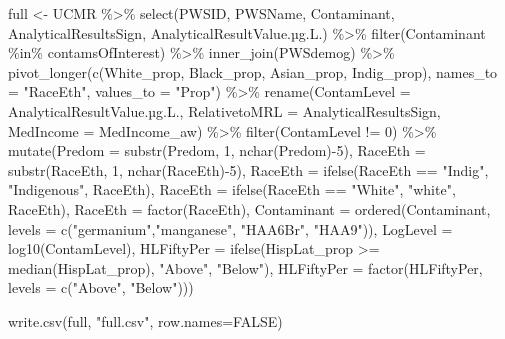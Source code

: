 \documentclass[
  letterpaper,
  DIV=11,
  numbers=noendperiod]{scrartcl}
\newenvironment{Shaded}{\begin{snugshade}}{\end{snugshade}}
\newcommand{\AttributeTok}[1]{\textcolor[rgb]{0.40,0.45,0.13}{#1}}
\newcommand{\ConstantTok}[1]{\textcolor[rgb]{0.56,0.35,0.01}{#1}}
\newcommand{\DecValTok}[1]{\textcolor[rgb]{0.68,0.00,0.00}{#1}}
\newcommand{\FunctionTok}[1]{\textcolor[rgb]{0.28,0.35,0.67}{#1}}
\newcommand{\NormalTok}[1]{\textcolor[rgb]{0.00,0.23,0.31}{#1}}
\newcommand{\OtherTok}[1]{\textcolor[rgb]{0.00,0.23,0.31}{#1}}
\newcommand{\SpecialCharTok}[1]{\textcolor[rgb]{0.37,0.37,0.37}{#1}}
\newcommand{\StringTok}[1]{\textcolor[rgb]{0.13,0.47,0.30}{#1}}
\begin{document}
\begin{Shaded}
\begin{Highlighting}[]
\NormalTok{full }\OtherTok{\textless{}{-}}\NormalTok{ UCMR }\SpecialCharTok{\%\textgreater{}\%} 
  \FunctionTok{select}\NormalTok{(PWSID, PWSName, Contaminant, AnalyticalResultsSign,}
\NormalTok{         AnalyticalResultValue.µg.L.) }\SpecialCharTok{\%\textgreater{}\%} 
  \FunctionTok{filter}\NormalTok{(Contaminant }\SpecialCharTok{\%in\%}\NormalTok{ contamsOfInterest) }\SpecialCharTok{\%\textgreater{}\%} 
  \FunctionTok{inner\_join}\NormalTok{(PWSdemog) }\SpecialCharTok{\%\textgreater{}\%} 
  \FunctionTok{pivot\_longer}\NormalTok{(}\FunctionTok{c}\NormalTok{(White\_prop, Black\_prop, Asian\_prop, Indig\_prop), }
               \AttributeTok{names\_to =} \StringTok{"RaceEth"}\NormalTok{, }\AttributeTok{values\_to =} \StringTok{"Prop"}\NormalTok{) }\SpecialCharTok{\%\textgreater{}\%} 
  \FunctionTok{rename}\NormalTok{(}\AttributeTok{ContamLevel =}\NormalTok{ AnalyticalResultValue.µg.L.,}
         \AttributeTok{RelativetoMRL =}\NormalTok{ AnalyticalResultsSign,}
         \AttributeTok{MedIncome =}\NormalTok{ MedIncome\_aw) }\SpecialCharTok{\%\textgreater{}\%} 
  \FunctionTok{filter}\NormalTok{(ContamLevel }\SpecialCharTok{!=} \DecValTok{0}\NormalTok{) }\SpecialCharTok{\%\textgreater{}\%} 
  \FunctionTok{mutate}\NormalTok{(}\AttributeTok{Predom =} \FunctionTok{substr}\NormalTok{(Predom, }\DecValTok{1}\NormalTok{, }\FunctionTok{nchar}\NormalTok{(Predom)}\SpecialCharTok{{-}}\DecValTok{5}\NormalTok{),}
         \AttributeTok{RaceEth =} \FunctionTok{substr}\NormalTok{(RaceEth, }\DecValTok{1}\NormalTok{, }\FunctionTok{nchar}\NormalTok{(RaceEth)}\SpecialCharTok{{-}}\DecValTok{5}\NormalTok{),}
         \AttributeTok{RaceEth =} \FunctionTok{ifelse}\NormalTok{(RaceEth }\SpecialCharTok{==} \StringTok{"Indig"}\NormalTok{, }\StringTok{"Indigenous"}\NormalTok{, RaceEth),}
         \AttributeTok{RaceEth =} \FunctionTok{ifelse}\NormalTok{(RaceEth }\SpecialCharTok{==} \StringTok{"White"}\NormalTok{, }\StringTok{"white"}\NormalTok{, RaceEth),}
         \AttributeTok{RaceEth =} \FunctionTok{factor}\NormalTok{(RaceEth),}
         \AttributeTok{Contaminant =} \FunctionTok{ordered}\NormalTok{(Contaminant, }
                              \AttributeTok{levels =} \FunctionTok{c}\NormalTok{(}\StringTok{"germanium"}\NormalTok{,}\StringTok{"manganese"}\NormalTok{, }\StringTok{"HAA6Br"}\NormalTok{, }\StringTok{"HAA9"}\NormalTok{)),}
         \AttributeTok{LogLevel =} \FunctionTok{log10}\NormalTok{(ContamLevel),}
         \AttributeTok{HLFiftyPer =} \FunctionTok{ifelse}\NormalTok{(HispLat\_prop }\SpecialCharTok{\textgreater{}=} \FunctionTok{median}\NormalTok{(HispLat\_prop), }\StringTok{"Above"}\NormalTok{, }\StringTok{"Below"}\NormalTok{),}
         \AttributeTok{HLFiftyPer =} \FunctionTok{factor}\NormalTok{(HLFiftyPer, }\AttributeTok{levels =} \FunctionTok{c}\NormalTok{(}\StringTok{"Above"}\NormalTok{, }\StringTok{"Below"}\NormalTok{))) }

\FunctionTok{write.csv}\NormalTok{(full, }\StringTok{"full.csv"}\NormalTok{, }\AttributeTok{row.names=}\ConstantTok{FALSE}\NormalTok{)}
\end{Highlighting}
\end{Shaded}
\end{document}
